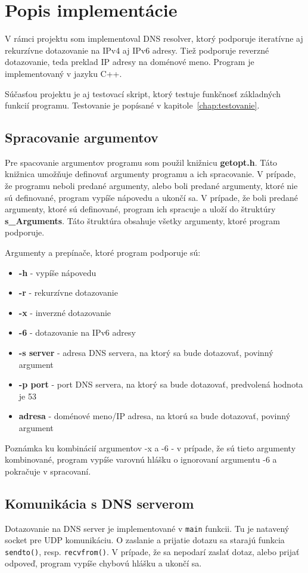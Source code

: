\chapter{Popis implementácie}
V rámci projektu som implementoval DNS resolver, ktorý podporuje iteratívne aj rekurzívne dotazovanie na IPv4 aj IPv6 adresy. Tiež podporuje reverzné dotazovanie, teda preklad IP adresy na doménové meno. Program je implementovaný v jazyku C++.

Súčasťou projektu je aj testovací skript, ktorý testuje funkčnosť základných funkcií programu. Testovanie je popísané v kapitole~\ref{chap:testovanie}.

\section{Spracovanie argumentov}\label{sec:argumenty}
Pre spacovanie argumentov programu som použil knižnicu \textbf{getopt.h}. Táto knižnica umožňuje definovať argumenty programu a ich spracovanie. V prípade, že programu neboli predané argumenty, alebo boli predané argumenty, ktoré nie sú definované, program vypíše nápovedu a ukončí sa. V prípade, že boli predané argumenty, ktoré sú definované, program ich spracuje a uloží do štruktúry \textbf{s\_Arguments}. Táto štruktúra obsahuje všetky argumenty, ktoré program podporuje.

Argumenty a prepínače, ktoré program podporuje sú:
\begin{itemize}
    \item \textbf{-h} - vypíše nápovedu
    \item \textbf{-r} - rekurzívne dotazovanie
    \item \textbf{-x} - inverzné dotazovanie
    \item \textbf{-6} - dotazovanie na IPv6 adresy
    \item \textbf{-s server} - adresa DNS servera, na ktorý sa bude dotazovať, povinný argument
    \item \textbf{-p port} - port DNS servera, na ktorý sa bude dotazovať, predvolená hodnota je 53
    \item \textbf{adresa} - doménové meno/IP adresa, na ktorú sa bude dotazovať, povinný argument
\end{itemize}

Poznámka ku kombinácií argumentov -x a -6 - v prípade, že sú tieto argumenty kombinované, program vypíše varovnú hlášku o ignorovaní argumentu -6 a pokračuje v spracovaní.

\section{Komunikácia s DNS serverom}
Dotazovanie na DNS server je implementované v \texttt{main} funkcii. Tu je natavený socket pre UDP komunikáciu. O zaslanie a prijatie dotazu sa starajú funkcia \texttt{sendto()}, resp. \texttt{recvfrom()}. V prípade, že sa nepodarí zaslať dotaz, alebo prijať odpoveď, program vypíše chybovú hlášku a ukončí sa.

